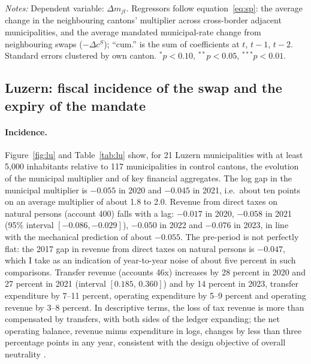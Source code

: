 \documentclass[11pt,a4paper]{article}
\begin{document}
\begin{table}[t]\centering\small
\begin{threeparttable}
\caption{Municipal response to neighbouring cantons' multiplier changes}\label{tab:spatial}

\begin{tablenotes}\footnotesize
\item \emph{Notes:} Dependent variable: $\Delta m_{jt}$. Regressors follow equation~\eqref{eq:sp}: the average change in the neighbouring cantons' multiplier across cross-border adjacent municipalities, and the average mandated municipal-rate change from neighbouring swaps ($-\Delta c^S$); ``cum.'' is the sum of coefficients at $t$, $t-1$, $t-2$. Standard errors clustered by own canton. $^{*}p<0.10$, $^{**}p<0.05$, $^{***}p<0.01$.
\end{tablenotes}
\end{threeparttable}
\end{table}

\subsection{Luzern: fiscal incidence of the swap and the expiry of the mandate}\label{sec:lu}

\paragraph{Incidence.} Figure~\ref{fig:lu} and Table~\ref{tab:lu} show, for 21 Luzern municipalities with at least 5,000 inhabitants relative to 117 municipalities in control cantons, the evolution of the municipal multiplier and of key financial aggregates. The log gap in the municipal multiplier is $-0.055$ in 2020 and $-0.045$ in 2021, i.e.\ about ten points on an average multiplier of about 1.8 to 2.0. Revenue from direct taxes on natural persons (account 400) falls with a lag: $-0.017$ in 2020, $-0.058$ in 2021 (95\% interval $[-0.086,-0.029]$), $-0.050$ in 2022 and $-0.076$ in 2023, in line with the mechanical prediction of about $-0.055$. The pre-period is not perfectly flat: the 2017 gap in revenue from direct taxes on natural persons is $-0.047$, which I take as an indication of year-to-year noise of about five percent in such comparisons. Transfer revenue (accounts 46x) increases by 28 percent in 2020 and 27 percent in 2021 (interval $[0.185,\,0.360]$) and by 14 percent in 2023, transfer expenditure by 7--11 percent, operating expenditure by 5--9 percent and operating revenue by 3--8 percent. In descriptive terms, the loss of tax revenue is more than compensated by transfers, with both sides of the ledger expanding; the net operating balance, revenue minus expenditure in logs, changes by less than three percentage points in any year, consistent with the design objective of overall neutrality \citep{KantonLU2019}.
\end{document}
